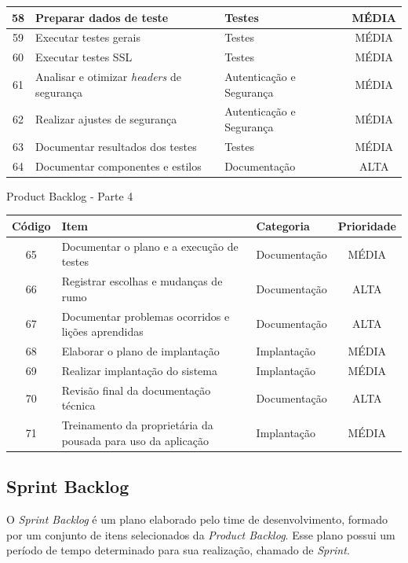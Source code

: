 \documentclass[
	12pt,				%
	openany,			%
	twoside,			%
	a4paper,			%
	english,			%
	french,				%
	spanish,			%
	brazil				%
	]{abntex2}
\begin{document}
\begin{quadro}[H]
\begin{tabular}{|c|p{6.5cm}|p{3.8cm}|c|}
	     	58 & Preparar dados de teste & Testes &	MÉDIA \\ \hline
	     	59 & Executar testes gerais & Testes & MÉDIA \\ \hline
	     	60 & Executar testes SSL & Testes &	MÉDIA \\ \hline
	     	61 & Analisar e otimizar \textit {headers} de segurança &
	     	Autenticação e Segurança &	MÉDIA \\ \hline	
	     	62 & Realizar ajustes de segurança & Autenticação e Segurança
	     	& MÉDIA \\ \hline
	     	63 & Documentar resultados dos testes &	Testes & MÉDIA \\ \hline
	     	64 & Documentar componentes e estilos & Documentação &
	     	ALTA \\ \hline
     	\end{tabular}
     		\end{quadro}

 \begin{quadro}[H]
	\caption{Product Backlog - Parte 4}
	\label{product_backlog_4}
	\begin{tabular}{|c|p{6.5cm}|p{3.8cm}|c|}
		\hline
		\textbf{Código} & \textbf{Item} & \textbf{Categoria} & \textbf{Prioridade} \\	\hline
		   65 & Documentar o plano e a execução de testes & Documentação &
		   MÉDIA \\ \hline
		   66 & Registrar escolhas e mudanças de rumo & Documentação &
		   ALTA \\ \hline
		   67 & Documentar problemas ocorridos e lições aprendidas &
		   Documentação & ALTA \\ \hline
		   68 & Elaborar o plano de implantação & Implantação & 
		   MÉDIA \\ \hline
		   69 & Realizar implantação do sistema & Implantação & MÉDIA \\ \hline
		   70 & Revisão final da documentação técnica & Documentação &
		   ALTA \\ \hline
		   71 & Treinamento da proprietária da pousada para uso da aplicação &	Implantação & MÉDIA \\ \hline
   \end{tabular}
\end{quadro}
\subsection{Sprint Backlog}
O \textit {Sprint Backlog} é um plano elaborado pelo time de desenvolvimento, formado por um conjunto de itens selecionados da \textit {Product Backlog}. Esse plano possui um período de tempo determinado para sua realização, chamado de \textit {Sprint}. 
\end{document}
